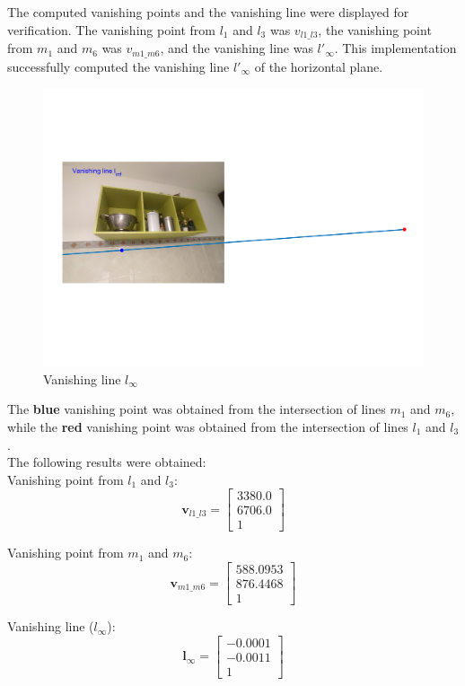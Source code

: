 \documentclass{Configuration_Files/PoliMi3i_thesis}
\begin{document}
The computed vanishing points and the vanishing line were displayed for verification. The vanishing point from \( l_1 \) and \( l_3 \) was \( v_{l1\_l3} \), the vanishing point from \( m_1 \) and \( m_6 \) was \( v_{m1\_m6} \), and the vanishing line was \( l'_{\infty} \). 
This implementation successfully computed the vanishing line \( l'_{\infty} \) of the horizontal plane.
\begin{figure}[H]
    \centering
    \includegraphics[width=0.78\linewidth]{Project Template/Images/vanishinglinepts.png}
    \caption{Vanishing line $l_{\infty}$}
    \label{fig:enter-label}
\end{figure}
The \textbf{blue} vanishing point was obtained from the intersection of lines \( m_1 \) and \( m_6 \), while the \textbf{red} vanishing point was obtained from the intersection of lines \( l_1 \) and \( l_3 \).\\

The following results were obtained:\\
Vanishing point from \( l_1 \) and \( l_3 \):
\[
\mathbf{v}_{l1\_l3} = \begin{bmatrix}
3380.0 \\
6706.0 \\
1
\end{bmatrix}
\]

Vanishing point from \( m_1 \) and \( m_6 \):
\[
\mathbf{v}_{m1\_m6} = \begin{bmatrix}
588.0953 \\
876.4468 \\
1
\end{bmatrix}
\]

Vanishing line (\( l_{\infty} \)):
\[
\mathbf{l}_{\infty} = \begin{bmatrix}
-0.0001 \\
-0.0011 \\
1
\end{bmatrix}
\]
\end{document}
